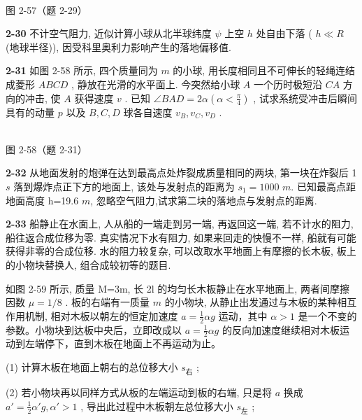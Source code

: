 \begin{center}
\resizebox{0.46\textwidth}{!}{}\\[4pt]
{\small 图 2-57（题 2-29）}
\end{center}

\newpage

\textbf{2-30} 不计空气阻力, 近似计算小球从北半球纬度 $\psi$ 上空 $h$ 处自由下落 ( $h \ll R$ (地球半径)), 因受科里奥利力影响产生的落地偏移值.

\newpage

\textbf{2-31} 如图 2-58 所示, 四个质量同为 $m$ 的小球, 用长度相同且不可伸长的轻绳连结成菱形 $ABCD$ , 静放在光滑的水平面上. 今突然给小球 $A$ 一个历时极短沿 $CA$ 方向的冲击, 使 $A$ 获得速度 $v$ . 已知 $\angle BAD = 2\alpha \left( \alpha < \frac{\pi}{4} \right)$ , 试求系统受冲击后瞬间具有的动量 $p$ 以及 $B, C, D$ 球各自速度 $v_B, v_C, v_D$ .

\begin{center}
\resizebox{0.49\textwidth}{!}{}\\[4pt]
{\small 图 2-58（题 2-31）}
\end{center}

\newpage

\textbf{2-32} 从地面发射的炮弹在达到最高点处炸裂成质量相同的两块, 第一块在炸裂后 1 $s$ 落到爆炸点正下方的地面上, 该处与发射点的距离为 $s_{1}=1000$ $m$. 已知最高点距地面高度 h=19.6 $m$, 忽略空气阻力,试求第二块的落地点与发射点的距离.

\newpage

\textbf{2-33} 船静止在水面上, 人从船的一端走到另一端, 再返回这一端, 若不计水的阻力, 船往返合成位移为零. 真实情况下水有阻力, 如果来回走的快慢不一样, 船就有可能获得非零的合成位移. 水的阻力较复杂, 可以改取水平地面上有摩擦的长木板, 板上的小物块替换人, 组合成较初等的题目.

如图 2-59 所示, 质量 M=3m, 长 2l 的均匀长木板静止在水平地面上, 两者间摩擦因数 $\mu=1/8$ . 板的右端有一质量 $m$ 的小物块, 从静止出发通过与木板的某种相互作用机制, 相对木板以朝左的恒定加速度 $a = \frac{1}{2}\alpha g$ 运动，其中 $\alpha > 1$ 是一个不变的参数。小物块到达板中央后，立即改成以 $a = \frac{1}{2}\alpha g$ 的反向加速度继续相对木板运动到左端停下，直到木板在地面上不再运动为止。

(1) 计算木板在地面上朝右的总位移大小 $s_{\text{右}}$ ;

(2) 若小物块再以同样方式从板的左端运动到板的右端, 只是将 $a$ 换成 $a' = \frac{1}{2} \alpha' g, \alpha' > 1$ , 导出此过程中木板朝左总位移大小 $s_{\text{左}}$ ;

